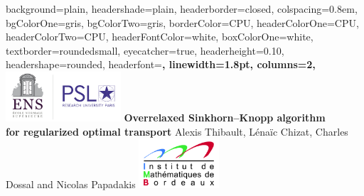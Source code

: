 \documentclass[portrait,a0paper,fontscale=0.35]{baposter} %
\theoremstyle{plain}
\theoremstyle{plain}
\theoremstyle{plain}
\theoremstyle{plain}
\begin{document}
\begin{poster}
{
background=plain,
headershade=plain,
headerborder=closed, %
colspacing=0.8em, %
bgColorOne=gris, %
bgColorTwo=gris, %
borderColor=CPU, %
headerColorOne=CPU, %
headerColorTwo=CPU, %
headerFontColor=white, %
boxColorOne=white, %
textborder=roundedsmall, %
eyecatcher=true, %
headerheight=0.10\textheight, %
headershape=rounded, %
headerfont=\Large\bf\textsc, %
linewidth=1.8pt, %
columns=2,
}
%
{\includegraphics[height=5em]{logo_ens_psl.png}} %
{\bf Overrelaxed Sinkhorn--Knopp algorithm\\ for regularized optimal transport\vspace{0.2em}} 
{{Alexis Thibault, L\'enaïc Chizat, Charles Dossal and  Nicolas Papadakis}} %
{\includegraphics[height=5em]{logo_imb.png}} %


\end{poster}
\end{document}
